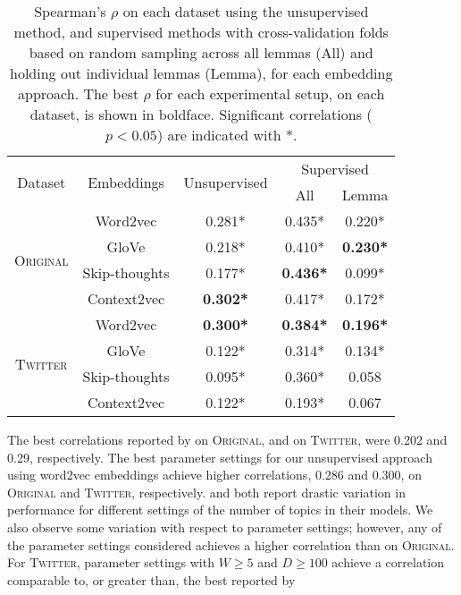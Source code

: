\documentclass[11pt]{article}
\newcommand\original{\textsc{Original}\xspace}
\newcommand\twitter{\textsc{Twitter}\xspace}
\newcommand\glove{GloVe\xspace}
\begin{document}




\begin{table}
\begin{center}
\small
\setlength{\tabcolsep}{2pt}
\begin{tabular}{ccccc}
\multirow{2}{*}{Dataset} & \multirow{2}{*}{Embeddings} & \multirow{2}{*}{Unsupervised} & \multicolumn{2}{c}{Supervised} \\
& & & All & Lemma \\
\hline
\multirow{4}{*}{\textsc{Original}} & Word2vec & 0.281* & 0.435* & 0.220* \\
 & \glove & 0.218* & 0.410* & \textbf{0.230*} \\
 & Skip-thoughts & 0.177* & \textbf{0.436*} & 0.099* \\
 & Context2vec & \textbf{0.302*} & 0.417* & 0.172* \\
\hline
\multirow{4}{*}{\textsc{Twitter}} & Word2vec & \textbf{0.300*} & \textbf{0.384*} & \textbf{0.196*} \\
 & \glove & 0.122* & 0.314* & 0.134*\\
 & Skip-thoughts & 0.095* & 0.360* & 0.058\phantom{*} \\
 & Context2vec & 0.122* &0.193*  & 0.067\phantom{*} \\
\hline
\end{tabular}
\caption{Spearman's $\rho$ on each dataset using the unsupervised
  method, and supervised methods with cross-validation folds based on
  random sampling across all lemmas (All) and holding out individual
  lemmas (Lemma), for each embedding approach. The best $\rho$ for
  each experimental setup, on each dataset, is shown in
  boldface. Significant correlations ($p<0.05$) are indicated with
  *.\label{tab:otherresults}}
\end{center}
\end{table}



The best correlations reported by  on \original,
and  on \twitter, were 0.202 and 0.29,
respectively. The best parameter settings for our unsupervised
approach using word2vec embeddings achieve higher correlations, 0.286
and 0.300, on \original and \twitter,
respectively.  and 
both report drastic variation in performance for different settings of
the number of topics in their models. We also observe some variation
with respect to parameter settings; however, any of the parameter
settings considered achieves a higher correlation than
 on \original. For \twitter, parameter
settings with $W \geq 5$ and $D \geq 100$ achieve a correlation
comparable to, or greater than, the best reported by
\end{document}
